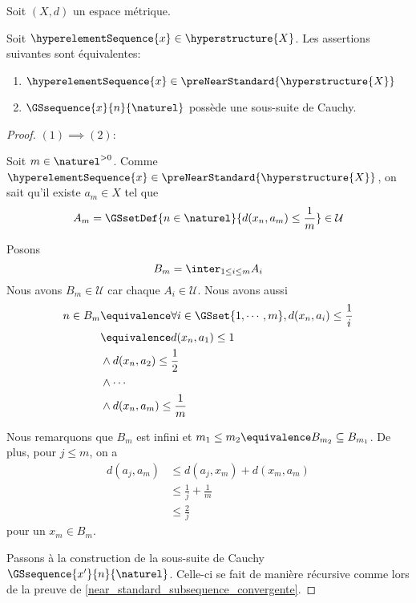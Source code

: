 \begin{proposition}
	Soit $(X, d)$ un espace métrique.

	Soit $\hyperelementSequence{x} \in \hyperstructure{X}$. Les assertions
suivantes sont équivalentes:

	\begin{enumerate}
		\item $\hyperelementSequence{x} \in
			\preNearStandard{\hyperstructure{X}}$
		\item $\GSsequence{x}{n}{\naturel}$ possède une sous-suite de Cauchy.
	\end{enumerate}
\end{proposition}

\ifdefined\outputproof
\begin{proof}
	$(1) \implies (2)$:

	Soit $m \in \naturel^{> 0}$. Comme $\hyperelementSequence{x} \in
	\preNearStandard{\hyperstructure{X}}$, on sait qu'il existe $a_{m} \in X$
	tel que
	\begin{equation}
		A_{m} = \GSsetDef{n \in \naturel}{d(x_{n}, a_{m}) \leq \frac{1}{m}} \in
		\mathcal{U}
	\end{equation}

	Posons
	\begin{equation}
		B_{m} = \inter_{1 \leq i \leq m} A_{i}
	\end{equation}
	Nous avons $B_{m} \in \mathcal{U}$ car chaque $A_{i} \in \mathcal{U}$.
	Nous avons aussi
	\begin{align}
		n \in B_{m} & \equivalence \forall i \in \GSset{1, \cdots, m}, d(x_{n},
		a_{i}) \leq \frac{1}{i} \\
		& \equivalence d(x_{n}, a_{1}) \leq 1 \\
		& \wedge d(x_{n}, a_{2}) \leq \frac{1}{2} \\
		& \wedge \cdots \\
		& \wedge d(x_{n}, a_{m}) \leq \frac{1}{m}
	\end{align}

	Nous remarquons que $B_{m}$ est infini et $m_{1} \leq m_{2} \equivalence
	B_{m_{2}} \subseteq B_{m_{1}}$.
	De plus, pour $j \leq m$, on a
	\begin{align}
		d(a_{j}, a_{m}) & \leq d(a_{j}, x_{m}) + d(x_{m}, a_{m}) \\
		& \leq \frac{1}{j} + \frac{1}{m} \\
		& \leq \frac{2}{j}
	\end{align} pour un $x_{m} \in B_{m}$.

	Passons à la construction de la sous-suite de Cauchy
	$\GSsequence{x'}{n}{\naturel}$. Celle-ci se fait de
	manière récursive comme lors de la preuve de
	\ref{near_standard_subsequence_convergente}.


\end{proof}
